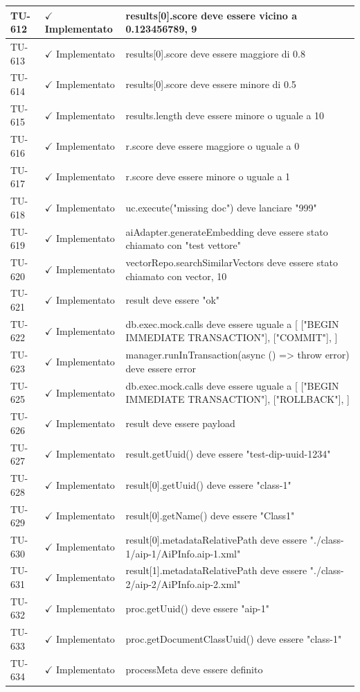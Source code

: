 ﻿\documentclass[a4paper,12pt]{article}
\newcommand{\ok}{\textcolor{green!60!black}{$\checkmark$ Implementato}}
\begin{document}
\begin{longtable}{|p{2cm}|p{3.5cm}|p{9.5cm}|}
\hline
TU-612 & \ok & results[0].score deve essere vicino a 0.123456789, 9 \\
\hline
TU-613 & \ok & results[0].score deve essere maggiore di 0.8 \\
\hline
TU-614 & \ok & results[0].score deve essere minore di 0.5 \\
\hline
TU-615 & \ok & results.length deve essere minore o uguale a 10 \\
\hline
TU-616 & \ok & r.score deve essere maggiore o uguale a 0 \\
\hline
TU-617 & \ok & r.score deve essere minore o uguale a 1 \\
\hline
TU-618 & \ok & uc.execute("missing doc") deve lanciare "999" \\
\hline
TU-619 & \ok & aiAdapter.generateEmbedding deve essere stato chiamato con "test vettore" \\
\hline
TU-620 & \ok & vectorRepo.searchSimilarVectors deve essere stato chiamato con vector, 10 \\
\hline
TU-621 & \ok & result deve essere "ok" \\
\hline
TU-622 & \ok & db.exec.mock.calls deve essere uguale a [ ["BEGIN IMMEDIATE TRANSACTION"], ["COMMIT"], ] \\
\hline
TU-623 & \ok & manager.runInTransaction(async () => { throw error}) deve essere error \\
\hline
TU-625 & \ok & db.exec.mock.calls deve essere uguale a [ ["BEGIN IMMEDIATE TRANSACTION"], ["ROLLBACK"], ] \\
\hline
TU-626 & \ok & result deve essere payload \\
\hline
TU-627 & \ok & result.getUuid() deve essere "test-dip-uuid-1234" \\
\hline
TU-628 & \ok & result[0].getUuid() deve essere "class-1" \\
\hline
TU-629 & \ok & result[0].getName() deve essere "Class1" \\
\hline
TU-630 & \ok & result[0].metadataRelativePath deve essere "./class-1/aip-1/AiPInfo.aip-1.xml" \\
\hline
TU-631 & \ok & result[1].metadataRelativePath deve essere "./class-2/aip-2/AiPInfo.aip-2.xml" \\
\hline
TU-632 & \ok & proc.getUuid() deve essere "aip-1" \\
\hline
TU-633 & \ok & proc.getDocumentClassUuid() deve essere "class-1" \\
\hline
TU-634 & \ok & processMeta deve essere definito \\

\end{longtable}
\end{document}

